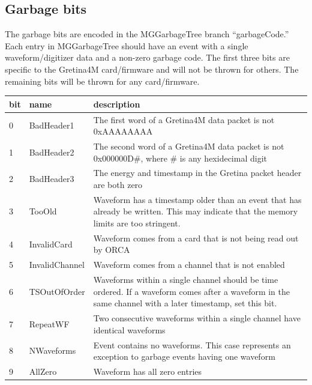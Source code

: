 \documentclass[/main.tex]{subfiles}
\begin{document}
\subsection{Garbage bits} \label{sec:garbage_bits}
The garbage bits are encoded in the MGGarbageTree branch ``garbageCode.'' Each entry in MGGarbageTree should have an event with a single waveform/digitizer data and a non-zero garbage code.
The first three bits are specific to the Gretina4M card/firmware and will not be thrown for others.
The remaining bits will be thrown for any card/firmware.
\par
\begin{tabular}{| l | l | p{} |} \hline
  bit & name & description \\ \hline\hline
  0  & BadHeader1     & The first word of a Gretina4M data packet is not 0xAAAAAAAA \\ \hline
  1  & BadHeader2     & The second word of a Gretina4M data packet is not 0x000000D\#, where \# is any hexidecimal digit \\ \hline
  2  & BadHeader3     & The energy and timestamp in the Gretina packet header are both zero \\ \hline
  3  & TooOld         & Waveform has a timestamp older than an event that has already be written. This may indicate that the memory limits are too stringent.  \\ \hline\hline
  4  & InvalidCard    & Waveform comes from a card that is not being read out by ORCA \\ \hline
  5  & InvalidChannel & Waveform comes from a channel that is not enabled  \\ \hline
  6  & TSOutOfOrder   & Waveforms within a single channel should be time ordered. If a waveform comes after a waveform in the same channel with a later timestamp, set this bit. \\ \hline
  7  & RepeatWF       & Two consecutive waveforms within a single channel have identical waveforms \\ \hline\hline
  8  & NWaveforms     & Event contains no waveforms. This case represents an exception to garbage events having one waveform \\ \hline
  9  & AllZero        & Waveform has all zero entries \\ \hline
\end{tabular}
\par
\end{document}

